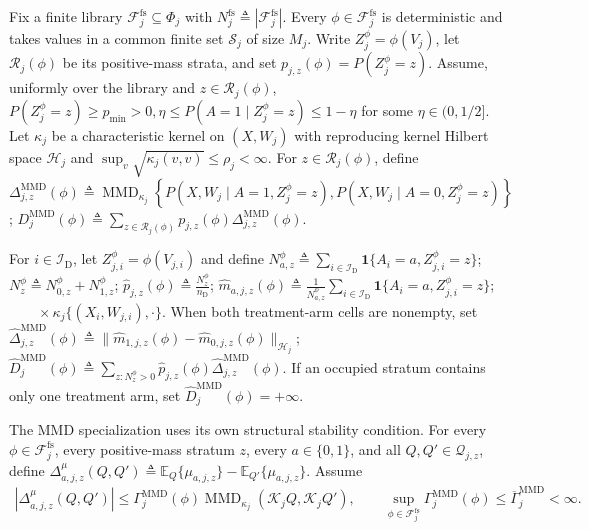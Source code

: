 Fix a finite library $\mathcal F_j^{\mathrm{fs}}\subseteq\Phi_j$ with $N_j^{\mathrm{fs}}\triangleq|\mathcal F_j^{\mathrm{fs}}|$. Every $\phi\in\mathcal F_j^{\mathrm{fs}}$ is deterministic and takes values in a common finite set $\mathcal S_j$ of size $M_j$. Write $Z_j^\phi=\phi(V_j)$, let $\mathcal R_j(\phi)$ be its positive-mass strata, and set $p_{j,z}(\phi)=P(Z_j^\phi=z)$. Assume, uniformly over the library and $z\in\mathcal R_j(\phi)$,
\(P(Z_j^\phi=z)\ge p_{\min}>0, \eta\le P(A=1\mid Z_j^\phi=z)\le1-\eta\)
for some $\eta\in(0,1/2]$. Let $\kappa_j$ be a characteristic kernel on $(X,W_j)$ with reproducing kernel Hilbert space $\mathcal H_j$ and
\(\sup_v\sqrt{\kappa_j(v,v)}\le\rho_j<\infty.\)
For $z\in\mathcal R_j(\phi)$, define
\(\Delta_{j,z}^{\mathrm{MMD}}(\phi) \triangleq \operatorname{MMD}_{\kappa_j} \left\{ P(X,W_j\mid A=1,Z_j^\phi=z), P(X,W_j\mid A=0,Z_j^\phi=z) \right\}\); \(D_j^{\mathrm{MMD}}(\phi) \triangleq \sum_{z\in\mathcal R_j(\phi)} p_{j,z}(\phi)\Delta_{j,z}^{\mathrm{MMD}}(\phi).\)

For $i\in\mathcal I_{\mathrm D}$, let $Z_{j,i}^\phi=\phi(V_{j,i})$ and define
\(N_{a,z}^\phi \triangleq \sum_{i\in\mathcal I_{\mathrm D}} \mathbf 1\{A_i=a,Z_{j,i}^\phi=z\}\); \(N_z^\phi\triangleq N_{0,z}^\phi+N_{1,z}^\phi\); \(\widehat p_{j,z}(\phi)\triangleq\frac{N_z^\phi}{n_{\mathrm D}}\); \(\widehat m_{a,j,z}(\phi) \triangleq \frac{1}{N_{a,z}^\phi} \sum_{i\in\mathcal I_{\mathrm D}} \mathbf 1\{A_i=a,Z_{j,i}^\phi=z\}\); \(\qquad{} \times\kappa_j\{(X_i,W_{j,i}),\cdot\}.\)
When both treatment-arm cells are nonempty, set
\(\widehat\Delta_{j,z}^{\mathrm{MMD}}(\phi) \triangleq \|\widehat m_{1,j,z}(\phi)-\widehat m_{0,j,z}(\phi)\|_{\mathcal H_j}\); \(\widehat D_j^{\mathrm{MMD}}(\phi) \triangleq \sum_{z:N_z^\phi>0} \widehat p_{j,z}(\phi)\widehat\Delta_{j,z}^{\mathrm{MMD}}(\phi).\)
If an occupied stratum contains only one treatment arm, set $\widehat D_j^{\mathrm{MMD}}(\phi)=+\infty$.

The MMD specialization uses its own structural stability condition. For every $\phi\in\mathcal F_j^{\mathrm{fs}}$, every positive-mass stratum $z$, every $a\in\{0,1\}$, and all $Q,Q'\in\mathcal Q_{j,z}$, define
\(\Delta^\mu_{a,j,z}(Q,Q') \triangleq \mathbb E_Q\{\mu_{a,j,z}\}-\mathbb E_{Q'}\{\mu_{a,j,z}\}.\)
Assume
\begin{align}
\left|\Delta^\mu_{a,j,z}(Q,Q')\right|
\le
\Gamma_j^{\mathrm{MMD}}(\phi)
\operatorname{MMD}_{\kappa_j}(\mathcal K_jQ,\mathcal K_jQ'),
\qquad
\sup_{\phi\in\mathcal F_j^{\mathrm{fs}}}
\Gamma_j^{\mathrm{MMD}}(\phi)
\le\overline\Gamma_j^{\mathrm{MMD}}<\infty.
\label{eq:finite-mmd-stability}
\end{align}

